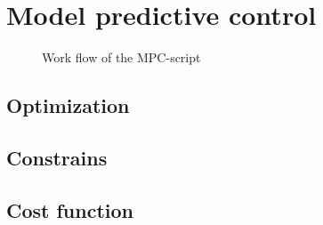 \chapter{Model predictive control}
\label{ch:mpc}
\begin{figure}[h]
            \centering
            \def\svgwidth{400pt}
            
            \caption{Work flow of the MPC-script}
            \label{fig:workflowMPC}
    \end{figure}
\section{Optimization}
\label{section:optimization}
\section{Constrains}
\label{section:constrains}
\section{Cost function}
\label{section:costfunction}
